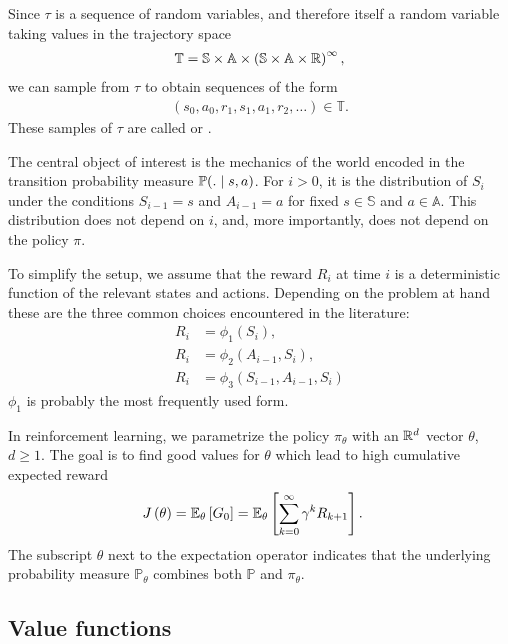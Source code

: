 \documentclass[a4paper,12pt]{amsart}
\newcommand{\stateSpace}{\mathbb S}
\newcommand{\actionSpace}{\mathbb A}
\newcommand{\policy}{\pi}
\newcommand{\discountFactor}{\gamma}
\newcommand{\prob}{\mathbb P}
\newcommand{\rewardFunc}{\phi}
\newcommand{\trajectory}{\tau}
\newcommand{\trajectorySpace}{\mathbb T}
\begin{document}
Since $\trajectory$ is a sequence of random variables, and therefore itself a random
variable taking values in the trajectory space 
\begin{align*}
    \trajectorySpace = \stateSpace\times\actionSpace\times 
        \left( \stateSpace\times\actionSpace\times\R \right)^{\infty},
\end{align*}
we can sample from $\trajectory$ to obtain sequences of the form
\begin{align*}
    \left( s_0, a_0, r_1, s_1, a_1, r_2,\ldots \right)\in\trajectorySpace.
\end{align*}
These samples of $\tau$ are called  or .

The central object of interest is the mechanics of the world encoded in the
transition probability measure $\prob(. \vb s, a)$. For $i>0$, it is the distribution of
$S_i$ under the conditions $S_{i-1} = s$ and $A_{i-1} = a$ for fixed
$s\in\stateSpace$ and $a\in\actionSpace$. This distribution does not depend on $i$, and,
more importantly, does not depend on the policy $\policy$. 

To simplify the setup, we assume that the reward $R_i$ at time $i$ is a deterministic
function of the relevant states and actions. Depending on the problem at hand
these are the three common choices encountered in the literature:
\begin{align*}
    R_{i} &= \rewardFunc_{1}(S_{i}), \\
    R_{i} &= \rewardFunc_{2}(A_{i-1}, S_{i}), \\
    R_{i} &= \rewardFunc_{3}(S_{i-1}, A_{i-1}, S_{i})
\end{align*}
$\rewardFunc_{1}$ is probably the most frequently used form.

In reinforcement learning, we parametrize the policy $\policy_\theta$ with
an $\mathbb{R}^{d}$ vector $\theta$, $d\geq 1$. The goal is to find good values for $\theta$ 
which lead to high cumulative expected reward
\begin{align*}
    J\left( \theta \right) &= \E_{\theta} \left[ G_0 \right] 
    = \E_{\theta} \left[ \sum_{k=0}^{\infty} \discountFactor^{k} R_{k+1} \right].
\end{align*}
The subscript $\theta$ next to the expectation operator indicates that
the underlying probability measure $\prob_{\theta}$ combines both
$\prob$ and $\policy_{\theta}$.

\subsection{Value functions}
\end{document}
